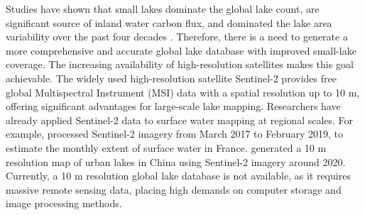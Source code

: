 \documentclass[preprint,12pt,authoryear]{elsarticle}
\begin{document}
Studies have shown that small lakes dominate the global lake count, are significant source of inland water carbon flux, and dominated the lake area variability over the past four decades \citep{holgerson_large_2016,pi_mapping_2022}. Therefore, there is a need to generate a more comprehensive and accurate global lake database with improved small-lake coverage. The increasing availability of high-resolution satellites makes this goal achievable. The widely used high-resolution satellite Sentinel-2 provides free global Multispectral Instrument (MSI) data with a spatial resolution up to 10 m, offering significant advantages for large-scale lake mapping. Researchers have already applied Sentinel-2 data to surface water mapping at regional scales. For example, \citet{yang_monthly_2020} processed Sentinel-2 imagery from March 2017 to February 2019, to estimate the monthly extent of surface water in France. \citet{song_high-resolution_2022} generated a 10 m resolution map of urban lakes in China using Sentinel-2 imagery around 2020. Currently, a 10 m resolution global lake database is not available, as it requires massive remote sensing data, placing high demands on computer storage and image processing methods.
\end{document}

